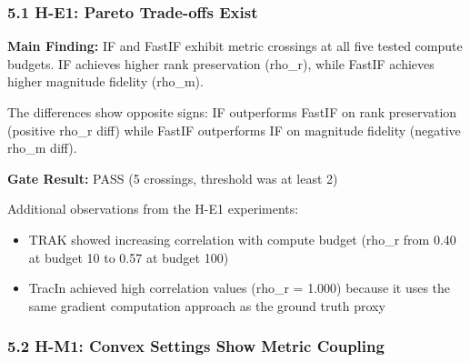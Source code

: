 
\subsubsection{5.1 H-E1: Pareto Trade-offs Exist}

\textbf{Main Finding:} IF and FastIF exhibit metric crossings at all five tested compute budgets. IF achieves higher rank preservation (rho\_r), while FastIF achieves higher magnitude fidelity (rho\_m).

\begin{table}[htbp]
\centering
{}
\end{table}

The differences show opposite signs: IF outperforms FastIF on rank preservation (positive rho\_r diff) while FastIF outperforms IF on magnitude fidelity (negative rho\_m diff).

\textbf{Gate Result:} PASS (5 crossings, threshold was at least 2)

Additional observations from the H-E1 experiments:
\begin{itemize}
\item TRAK showed increasing correlation with compute budget (rho\_r from 0.40 at budget 10 to 0.57 at budget 100)
\item TracIn achieved high correlation values (rho\_r = 1.000) because it uses the same gradient computation approach as the ground truth proxy
\end{itemize}

\subsubsection{5.2 H-M1: Convex Settings Show Metric Coupling}


